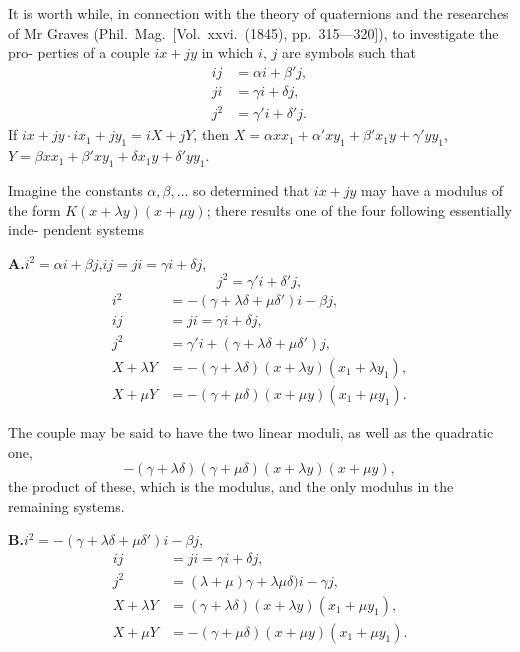\documentclass[11pt,a4paper]{book}
\begin{document}
\bigskip
\setcounter{page}{128}

It is worth while, in connection with the theory of quaternions and the researches
of Mr Graves (Phil.\ Mag.\ [Vol.~xxvi.~(1845), pp.~315---320]), to investigate the pro-
perties of a couple $ix + jy$ in which $i$, $j$ are symbols such that
\begin{align*}
ij &= \alpha i + \beta' j,\\
ji &= \gamma i + \delta j,\\
j^2 &= \gamma' i + \delta' j.
\end{align*}
If $ix + jy \cdot ix_1 + jy_1 = iX + jY$,
then $X = \alpha xx_1 + \alpha' xy_1 + \beta' x_1y + \gamma' yy_1$,
$Y = \beta xx_1 + \beta' xy_1 + \delta x_1y + \delta' yy_1$.

Imagine the constants $\alpha, \beta, \ldots$ so determined that $ix + jy$ may have a modulus of
the form $K(x + \lambda y)(x + \mu y)$; there results one of the four following essentially inde-
pendent systems

\medskip
\textbf{A.}\quad $i^2 = \alpha i + \beta j$,\quad $ij = ji = \gamma i + \delta j$,
\[
j^2 = \gamma' i + \delta' j,
\]
\begin{align*}
i^2 &= -(\gamma + \lambda\delta + \mu\delta') i - \beta j,\\
ij &= ji = \gamma i + \delta j,\\
j^2 &= \gamma' i + (\gamma + \lambda\delta + \mu\delta')j,\\
X + \lambda Y &= -(\gamma + \lambda\delta)(x + \lambda y)(x_1 + \lambda y_1),\\
X + \mu Y &= -(\gamma + \mu\delta)(x + \mu y)(x_1 + \mu y_1).
\end{align*}

\newpage
\setcounter{page}{129}

The couple may be said to have the two linear moduli,
as well as the quadratic one,
\[-(\gamma + \lambda\delta)(\gamma + \mu\delta)(x + \lambda y)(x + \mu y),\]
the product of these, which is the modulus, and the only modulus in the remaining
systems.

\medskip
\textbf{B.}\quad $i^2 = -(\gamma + \lambda\delta + \mu\delta') i - \beta j$,
\begin{align*}
ij &= ji = \gamma i + \delta j,\\
j^2 &= (\lambda + \mu)\gamma + \lambda\mu\delta) i - \gamma j,\\
X + \lambda Y &= (\gamma + \lambda\delta)(x + \lambda y)(x_1 + \mu y_1),\\
X + \mu Y &= -(\gamma + \mu\delta)(x + \mu y)(x_1 + \mu y_1).
\end{align*}
\end{document}
